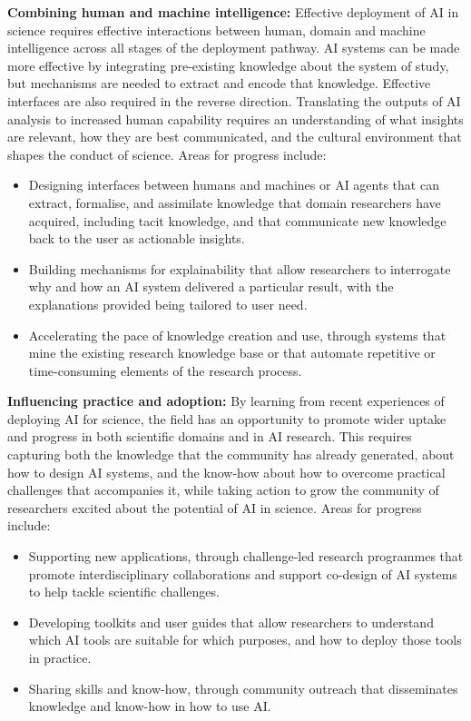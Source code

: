 \noindent\textbf{Combining human and machine intelligence:} Effective
deployment of AI in science requires effective interactions between
human, domain and machine intelligence across all stages of the
deployment pathway. AI systems can be made more effective by integrating
pre-existing knowledge about the system of study, but mechanisms are
needed to extract and encode that knowledge. Effective interfaces are
also required in the reverse direction. Translating the outputs of AI
analysis to increased human capability requires an understanding of what
insights are relevant, how they are best communicated, and the cultural
environment that shapes the conduct of science. Areas for progress
include:

\begin{itemize}
\item
  Designing interfaces between humans and machines or AI agents that can
  extract, formalise, and assimilate knowledge that domain researchers
  have acquired, including tacit knowledge, and that communicate new
  knowledge back to the user as actionable insights.
\item
  Building mechanisms for explainability that allow researchers to
  interrogate why and how an AI system delivered a particular result,
  with the explanations provided being tailored to user need.
\item
  Accelerating the pace of knowledge creation and use, through systems
  that mine the existing research knowledge base or that automate
  repetitive or time-consuming elements of the research process.
\end{itemize}

\noindent\textbf{Influencing practice and adoption:} By learning from
recent experiences of deploying AI for science, the field has an
opportunity to promote wider uptake and progress in both scientific
domains and in AI research. This requires capturing both the knowledge
that the community has already generated, about how to design AI
systems, and the know-how about how to overcome practical challenges
that accompanies it, while taking action to grow the community of
researchers excited about the potential of AI in science. Areas for
progress include:

\begin{itemize}
\item
  Supporting new applications, through challenge-led research programmes
  that promote interdisciplinary collaborations and support co-design of
  AI systems to help tackle scientific challenges.
\item
  Developing toolkits and user guides that allow researchers to
  understand which AI tools are suitable for which purposes, and how to
  deploy those tools in practice.
\item
  Sharing skills and know-how, through community outreach that
  disseminates knowledge and know-how in how to use AI.
\end{itemize}

